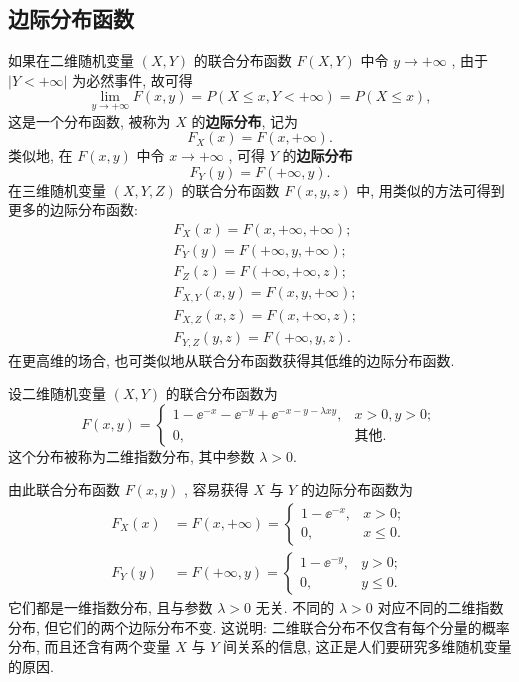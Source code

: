   \subsection{边际分布函数}\label{ssec:3.2.1}
  如果在二维随机变量 $(X,Y)$ 的联合分布函数 $F(X,Y)$ 中令 $y\to+\infty$ , 由于 $|Y<+\infty|$ 为必然事件, 故可得
  \begin{equation*}
  \lim_{y\to+\infty}F(x,y)=P(X\leqslant x,Y<+\infty)=P(X\leqslant x),
  \end{equation*}
  这是一个分布函数, 被称为 $X$ 的\textbf{边际分布}, 记为
  \begin{equation}
  F_{X}(x)=F(x,+\infty).\label{eq:3.2.1}
  \end{equation}
  类似地, 在 $F(x,y)$ 中令 $x\to+\infty$ , 可得 $Y$ 的\textbf{边际分布}
  \begin{equation}
  F_{Y}(y)=F(+\infty,y).\label{eq:3.2.2}
  \end{equation}
  在三维随机变量 $(X,Y,Z)$ 的联合分布函数 $F(x,y,z)$ 中, 用类似的方法可得到更多的边际分布函数:
  \begin{align*}
  &F_{X}(x) = F(x,+\infty,+\infty);\\
  &F_{Y}(y) = F(+\infty,y,+\infty);\\
  &F_{Z}(z) = F(+\infty,+\infty,z);\\
  &F_{X,Y}(x,y) = F(x,y,+\infty);\\
  &F_{X,Z}(x,z) = F(x,+\infty,z);\\
  &F_{Y,Z}(y,z) = F(+\infty,y,z).
  \end{align*}
  在更高维的场合, 也可类似地从联合分布函数获得其低维的边际分布函数.
  \begin{example}\label{exam:3.2.1}
  	设二维随机变量 $(X,Y)$ 的联合分布函数为
  	\begin{equation*}
  	F(x,y)=
  	\begin{cases}
  	1-\ee^{-x}-\ee^{-y}+\ee^{-x-y-\lambda xy}, & x>0,y>0;\\
  	0, & \text{其他}.
  	\end{cases}
  	\end{equation*}
  	这个分布被称为二维指数分布, 其中参数 $\lambda>0$.
  	
  	由此联合分布函数 $F(x,y)$ , 容易获得 $X$ 与 $Y$ 的边际分布函数为
  	\begin{align*}
  	F_{X}(x) &= F(x,+\infty)=
  	\begin{cases}
  	1-\ee^{-x}, & x>0;\\
  	0, & x\leqslant0.
  	\end{cases}\\
  	F_{Y}(y) &= F(+\infty,y)=
  	\begin{cases}
  	1-\ee^{-y}, & y>0;\\
  	0, & y\leqslant0.
  	\end{cases}
  	\end{align*}
  	它们都是一维指数分布, 且与参数 $\lambda>0$ 无关. 不同的 $\lambda>0$ 对应不同的二维指数分布, 但它们的两个边际分布不变. 这说明: 二维联合分布不仅含有每个分量的概率分布, 而且还含有两个变量 $X$ 与 $Y$ 间关系的信息, 这正是人们要研究多维随机变量的原因.
  \end{example}

